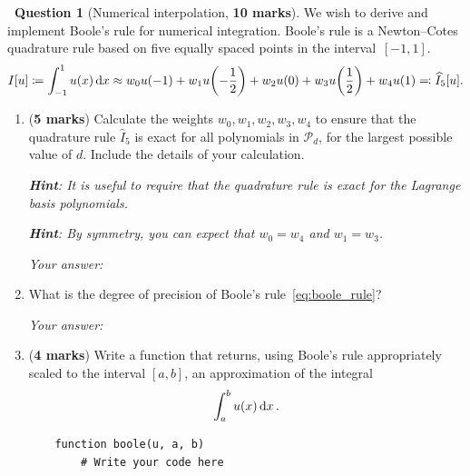 \documentclass[10pt]{article}
\theoremstyle{definition}
\newtheorem{question}{{\normalfont \faGears}~Question}
\renewcommand{\mymarks}[1]{\textbf{#1 marks}}
\begin{document}
\newpage
\begin{question}
    [Numerical interpolation, \mymarks{10}]
    We wish to derive and implement Boole's rule for numerical integration.
    Boole's rule is a Newton--Cotes quadrature rule based on five equally spaced points in the interval~$[-1, 1]$.
    \begin{equation}
        \label{eq:boole_rule}
        I[u] \coloneq \int_{-1}^{1} u(x) \, \mathrm d x
        \approx w_0 u(-1) + w_1 u{\left(- \frac{1}{2}\right)} + w_2 u(0) + w_3 u{\left(\frac{1}{2}\right)} + w_4 u(1)
        \eqcolon \widehat I_5[u].
    \end{equation}

    \begin{enumerate}
        \item
            (\mymarks{5})
            Calculate the weights $w_0, w_1, w_2, w_3, w_4$ to ensure that the quadrature rule $\widehat I_5$ is exact for all polynomials in $\mathcal P_d$,
            for the largest possible value of $d$.
            Include the details of your calculation.

            \textit{\textbf{Hint}: It is useful to require that the quadrature rule is exact for the Lagrange basis polynomials.}

            \textit{\textbf{Hint}: By symmetry, you can expect that $w_0 = w_4$ and $w_1 = w_3$.}

            \textit{Your answer:}
            \vspace{13cm}

        \item
            What is the degree of precision of Boole's rule~\eqref{eq:boole_rule}?

            \textit{Your answer:}

        \newpage
        \item
            (\mymarks{4})
            Write a function  that returns, using Boole's rule appropriately scaled to the interval $[a, b]$,
            an approximation of the integral
            \begin{align}
                \label{eq:integral_midpoint}
                \int_{a}^{b} u(x) \, \mathrm d x \, .
            \end{align}

            \begin{verbatim}
    function boole(u, a, b)
        # Write your code here















\end{verbatim}
\end{enumerate}
\end{question}
\end{document}
